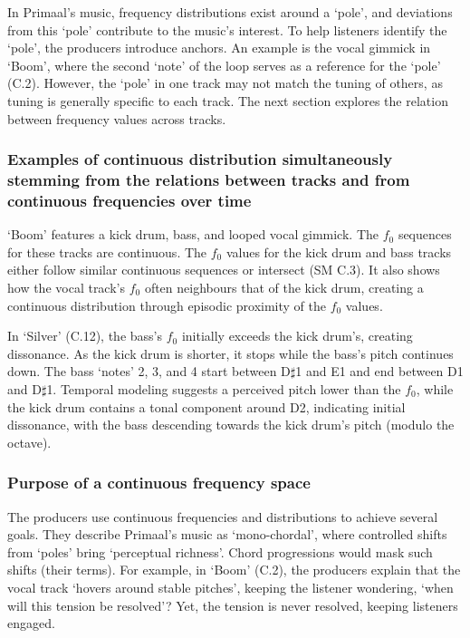 \documentclass{article}
\begin{document}
In Primaal's music, frequency distributions exist around a `pole', and deviations from this `pole' contribute to the music's interest. To help listeners identify the `pole', the producers introduce anchors. An example is the vocal gimmick in `Boom', where the second `note' of the loop serves as a reference for the `pole' (C.2). However, the `pole' in one track may not match the tuning of others, as tuning is generally specific to each track. The next section explores the relation between frequency values across tracks.




\subsubsection{Examples of continuous distribution simultaneously stemming from the relations between tracks and from continuous frequencies over time}\label{subsub:continuous}

`Boom' features a kick drum, bass, and looped vocal gimmick. The $f_0$ sequences for these tracks are continuous. The $f_0$ values for the kick drum and bass tracks either follow similar continuous sequences or intersect (SM C.3). It also shows how the vocal track's $f_0$ often neighbours that of the kick drum, creating a continuous distribution through episodic proximity of the $f_0$ values.

In `Silver' (C.12), the bass's $f_0$ initially exceeds the kick drum's, creating dissonance. As the kick drum is shorter, it stops while the bass's pitch continues down. The bass `notes' 2, 3, and 4 start between D$\sharp$1 and E1 and end between D1 and D$\sharp$1. Temporal modeling suggests a perceived pitch lower than the $f_0$, while the kick drum contains a tonal component around D2, indicating initial dissonance, with the bass descending towards the kick drum's pitch (modulo the octave).



\subsubsection{Purpose of a continuous frequency space}\label{sec:purposecontinuous}

The producers use continuous frequencies and distributions to achieve several goals.
They describe Primaal's music as `mono-chordal', where controlled shifts from `poles' bring `perceptual richness'. Chord progressions would mask such shifts (their terms). For example, in `Boom' (C.2), the producers explain that the vocal track `hovers around stable pitches', keeping the listener wondering, `when will this tension be resolved'? Yet, the tension is never resolved, keeping listeners engaged.
\end{document}

